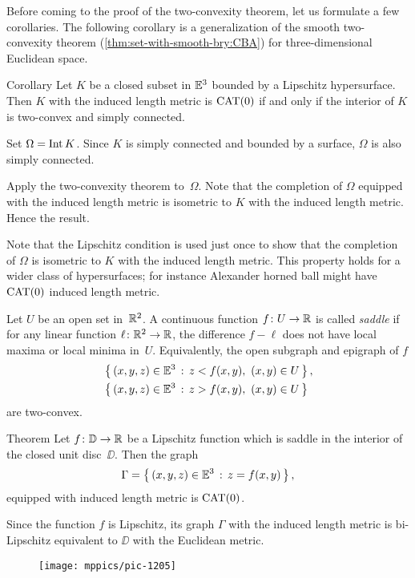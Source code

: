 Before coming to the proof of the two-convexity theorem, 
let us formulate a few corollaries.
The following corollary is a generalization of the smooth two-convexity theorem (\ref{thm:set-with-smooth-bry:CBA}) for  three-dimensional Euclidean space.

\begin{thm}{Corollary}\label{cor:shefel}
Let $K$ be a closed subset in $\mathbb{E}^3$ 
bounded by a Lipschitz hypersurface.
Then $K$ with the induced length metric is $\mathrm{CAT}(0)$  
if and only if the interior of $K$ is two-convex and simply connected.
\end{thm}

Set $\Omega=\operatorname{\rm Int}\nolimits K$.
Since $K$ is simply connected and bounded by a surface, 
$\Omega$ is also simply connected.

Apply the two-convexity theorem to~$\Omega$.
Note that the completion of $\Omega$ equipped with the induced length metric 
is isometric to $K$ with the induced length metric.
Hence the result.
\qeds

Note that the Lipschitz condition is used just once to show that the completion of $\Omega$ is isometric to $K$ with the induced length metric.
This property holds for a wider class of hypersurfaces;
for instance Alexander horned ball might have $\mathrm{CAT}(0)$ induced length metric. 

Let $U$ be an open set in~$\mathbb{R}^2$.
A continuous function $f\colon U\to\mathbb{R}$ is called 
\emph{saddle} 
if for any linear function $\ell\colon\mathbb{R}^2\to\mathbb{R}$, the difference 
$f-\ell$
does not have local maxima or local minima in~$U$.
Equivalently, the open subgraph and epigraph of $f$
\begin{align*}
&\left\{\,{(x,y,z)\in\mathbb{E}^3}\,:\,{z<f(x,y),\ (x,y)\in U}\,\right\},
\\
&\left\{\,{(x,y,z)\in\mathbb{E}^3}\,:\,{z>f(x,y),\ (x,y)\in U}\,\right\}
\end{align*}
are two-convex. 

\begin{thm}{Theorem}\label{thm:shefel-graph}
Let $f\colon\mathbb{D}\to \mathbb{R}$ be a Lipschitz function which is saddle in the interior of the closed unit disc~$\DD$. 
Then the graph
\[\Gamma=\left\{\,{(x,y,z)\in \mathbb{E}^3}\,:\,{z=f(x,y)}\,\right\},\] 
equipped with induced length metric is $\mathrm{CAT}(0)$.
\end{thm}

Since the function $f$ is Lipschitz,
its  graph $\Gamma$ with the induced length metric is bi-Lipschitz equivalent to $\DD$ with the Euclidean metric.

\begin{wrapfigure}{r}{20mm}
\vskip-4mm
\centering
\texttt{[image: mppics/pic-1205]}
\end{wrapfigure}

